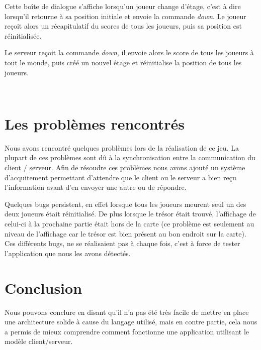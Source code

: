 \documentclass[a4paper,10pt]{article}
\begin{document}
		\begin{minipage}[t]{0.46\textwidth}
			\vspace{2pt}
			Cette boîte de dialogue s'affiche lorsqu'un joueur change d'étage, c'est à dire lorsqu'il retourne à sa position initiale et envoie la commande
\emph{down}. Le joueur reçoit alors un récapitulatif du scores de tous les joueurs, puis sa position est réinitialisée.
		\end{minipage}
		\hfill
		\begin{minipage}[t]{0.46\textwidth}
			\vspace{2pt}
			Le serveur reçoit la commande \emph{down}, il envoie alors le score de tous les joueurs à tout le monde, puis créé un nouvel étage et réinitialise
la position de tous les joueurs.
		\end{minipage}\\

	\newpage
	\section{Les problèmes rencontrés}
	Nous avons rencontré quelques problèmes lors de la réalisation de ce jeu. La plupart de ces problèmes sont dû à la synchronisation entre la communication
du client / serveur. Afin de résoudre ces problèmes nous avons ajouté un système d'acquitement permettant d'attendre que le client ou le serveur a bien reçu
l'information avant d'en envoyer une autre ou de répondre.

	Quelques bugs persistent, en effet lorsque tous les joueurs meurent seul un des deux joueurs était réinitialisé. De plus lorsque le trésor était trouvé,
l'affichage de celui-ci à la prochaine partie était hors de la carte (ce problème est seulement au niveau de l'affichage car le trésor est bien présent au bon
endroit sur la carte). Ces différents bugs, ne se réalisaient pas à chaque fois, c'est à force de tester l'application que nous les avons détectés.
		
	\newpage
	\section{Conclusion}

	Nous pouvons conclure en disant qu'il n'a pas été très facile de mettre en place une architecture solide à cause du langage utilisé, mais en contre partie,
cela nous a permis de mieux comprendre comment fonctionne une application utilisant le modèle client/serveur.
	
	
\end{document}
